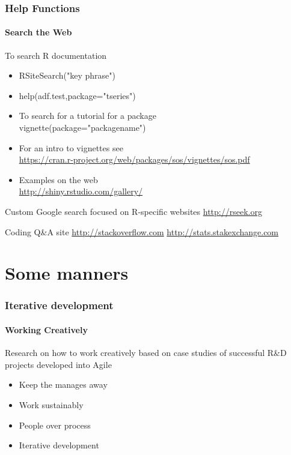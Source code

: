 \documentclass[12pt]{beamer}\usepackage[]{graphicx}\usepackage[]{color}
\begin{document}
\begin{frame}
  \frametitle{Help Functions}
  \framesubtitle{Search the Web}
\begin{block}{To search R documentation}
\begin{itemize}
\item RSiteSearch("key phrase")
\item help(adf.test,package="tseries")
\item To search for a tutorial for a package\\
 vignette(package="packagename")
\item For an intro to vignettes see\\
\url{https://cran.r-project.org/web/packages/sos/vignettes/sos.pdf}
\item Examples on the web\\
\url{http://shiny.rstudio.com/gallery/}
\end{itemize}
\end{block}
\begin{block}{Custom Google search focused on R-specific websites}
\url{http://rseek.org}
\end{block}

\begin{block}{Coding Q\&A site}
\url{http://stackoverflow.com}
\url{http://stats.stakexchange.com}
\end{block}

\end{frame}

\section*{Some manners}
\begin{frame}
  \frametitle{Iterative development}
  \framesubtitle{Working Creatively}
Research on how to work creatively based on case studies of  successful R\&D projects developed into Agile
\begin{itemize}
\item Keep the manages away
\item Work sustainably
\item People over process
\item Iterative development
\end{itemize}
\end{frame}
\end{document}
